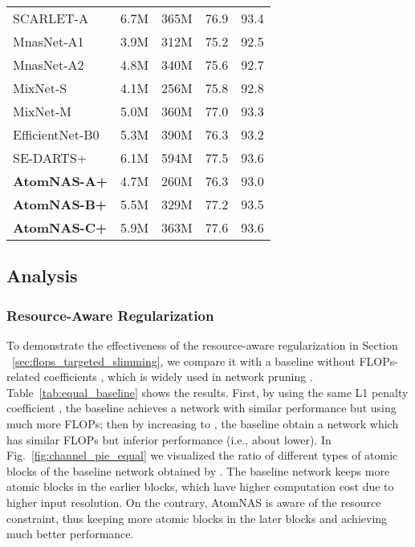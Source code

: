 \documentclass{article} \usepackage{iclr2020_conference,times}
\newcommand{\flops}{FLOPs\xspace}
\begin{document}
\begin{table}[t]
\begin{center}
\begin{tabular}{lllll}
\midrule

SCARLET-A \citep{chu2019scarletnas} & 6.7M & 365M & 76.9 & 93.4 \\
MnasNet-A1 \citep{tan2019mnasnet}      & 3.9M & 312M & 75.2 & 92.5 \\
MnasNet-A2      & 4.8M & 340M & 75.6 & 92.7 \\
MixNet-S \citep{tan2019mixnet}      & 4.1M & 256M & 75.8 & 92.8 \\
MixNet-M      & 5.0M & 360M & 77.0 & 93.3 \\
EfficientNet-B0 \citep{mingxing2019efficient} & 5.3M & 390M & 76.3 & 93.2 \\
SE-DARTS+ \citep{liang2019dartsplus} & 6.1M & 594M & 77.5 & 93.6 \\


\textbf{AtomNAS-A+} & 4.7M & 260M & 76.3 & 93.0 \\
\textbf{AtomNAS-B+} & 5.5M & 329M & 77.2 & 93.5 \\
\textbf{AtomNAS-C+} & 5.9M & 363M & 77.6 & 93.6 \\
\bottomrule
\end{tabular}
\end{center}
\label{tab:overall_compare}
\end{table}


\subsection{Analysis}    
\label{sub:analysis}














\subsubsection{Resource-Aware Regularization}

To demonstrate the effectiveness of the resource-aware regularization in Section ~\ref{sec:flops_targeted_slimming}, we compare it with a baseline without \flops-related coefficients , which is widely used in network pruning \citep{zhuang2017slimming,yihui2017channel}.
Table~\ref{tab:equal_baseline} shows the results. First, by using the same L1 penalty coefficient , the baseline achieves a network with similar performance but using much more \flops; then by increasing  to , the baseline obtain a network which has similar \flops but inferior performance (i.e., about  lower). In Fig.~\ref{fig:channel_pie_equal} we visualized the ratio of different types of atomic blocks of the baseline network obtained by . The baseline network keeps more atomic blocks in the earlier blocks, which have higher computation cost due to higher input resolution. On the contrary, AtomNAS is aware of the resource constraint, thus keeping more atomic blocks in the later blocks and achieving much better performance.
\end{document}
